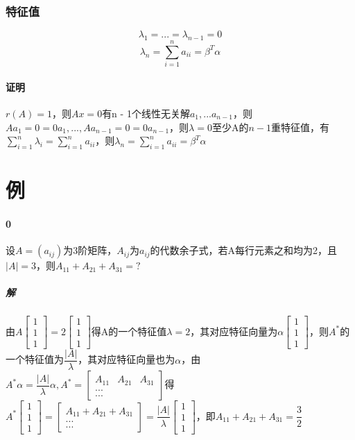 \subsubsection{特征值}
\[\lambda_1 = ... = \lambda_{n - 1} = 0\]
\[\lambda_n = \sum_{i = 1}^na_{ii} = \beta^T\alpha\]

\paragraph{证明}
\(r(A) = 1\)，则\(Ax = 0\)有n - 1个线性无关解\(a_1, ... a_{n - 1}\)，则\(Aa_1 = 0 = 0a_1, ..., Aa_{n - 1} = 0 = 0a_{n - 1}\)，则\(\lambda = 0\)至少A的\(n - 1\)重特征值，有\(\displaystyle\sum_{i = 1}^n\lambda_i = \sum_{i = 1}^na_{ii}\)，则\(\lambda_n = \displaystyle\sum_{i = 1}^na_{ii} = \beta^T\alpha\)


\section{例}

\paragraph{0}
设\(A = (a_{ij})\)为3阶矩阵，\(A_{ij}\)为\(a_{ij}\)的代数余子式，若A每行元素之和均为2，且\(|A| = 3\)，则\(A_{11} + A_{21} + A_{31} = ?\)

\subparagraph{解}
由\(A\begin{bmatrix}
    1 \\ 
    1 \\ 
    1
\end{bmatrix} = 2\begin{bmatrix}
    1 \\ 
    1 \\ 
    1
\end{bmatrix}\)得A的一个特征值\(\lambda = 2\)，其对应特征向量为\(\alpha\begin{bmatrix}
    1 \\ 
    1 \\ 
    1
\end{bmatrix}\)，则\(A^*\)的一个特征值为\(\dfrac{|A|}{\lambda}\)，其对应特征向量也为\(\alpha\)，由\(A^*\alpha = \dfrac{|A|}{\lambda}\alpha, A^* = \begin{bmatrix}
    A_{11} & A_{21} & A_{31} \\
    ... \\
    ...
\end{bmatrix}\)得\(A^*\begin{bmatrix}
    1 \\ 
    1 \\ 
    1
\end{bmatrix} = \begin{bmatrix}
    A_{11} + A_{21} + A_{31} \\ 
    ... \\ 
    ...
\end{bmatrix} = \dfrac{|A|}{\lambda}\begin{bmatrix}
    1 \\ 
    1 \\ 
    1
\end{bmatrix}\)，即\(A_{11} + A_{21} + A_{31} = \dfrac{3}{2}\)

